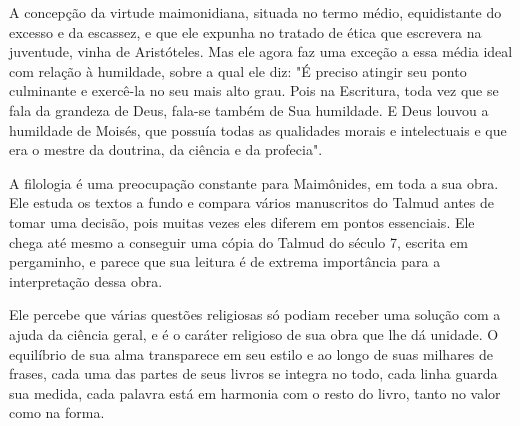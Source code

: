 A concepção da virtude maimonidiana, situada no termo médio,
equi­distante do excesso e da escassez, e que ele expunha no tratado de
ética que escrevera na juventude, vinha de Aristóteles. Mas ele agora
faz uma exceção a essa média ideal com relação à humildade, sobre a qual
ele diz: "É preciso atingir seu ponto culminante e exercê-la no seu mais
alto grau. Pois na Escritu­ra, toda vez que se fala da grandeza de Deus,
fala-se também de Sua humildade. E Deus louvou a humildade de Moisés,
que possuía todas as qualidades morais e intelectuais e que era o mestre
da doutrina, da ciência e da profecia".

A filologia é uma preocupação constante para Maimônides, em toda a sua
obra. Ele estuda os textos a fundo e compara vários manuscritos do
Talmud antes de tomar uma decisão, pois muitas vezes eles diferem em
pontos essen­ciais. Ele chega até mesmo a conseguir uma cópia do Talmud
do século 7, es­crita em pergaminho, e parece que sua leitura é de
extrema importância para a interpretação dessa obra.

Ele percebe que várias questões religiosas só podiam receber uma solução
com a ajuda da ciência geral, e é o caráter religioso de sua obra que
lhe dá unidade. O equilíbrio de sua alma transparece em seu estilo e ao
longo de suas milhares de frases, cada uma das partes de seus livros se
integra no to­do, cada linha guarda sua medida, cada palavra está em
harmonia com o resto do livro, tanto no valor como na forma.

